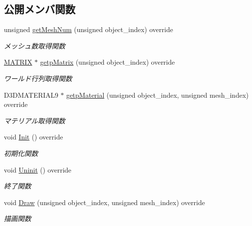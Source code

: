 \subsection*{公開メンバ関数}
\begin{DoxyCompactItemize}
\item 
unsigned \mbox{\hyperlink{class_needle_draw_a904f0aa7550f450f4b7bb2845c863e23}{get\+Mesh\+Num}} (unsigned object\+\_\+index) override
\begin{DoxyCompactList}\small\item\em メッシュ数取得関数 \end{DoxyCompactList}\item 
\mbox{\hyperlink{_matrix_8h_a032295cd9fb1b711757c90667278e744}{M\+A\+T\+R\+IX}} $\ast$ \mbox{\hyperlink{class_needle_draw_a7ae74f52a190793745b5339a6be559d7}{getp\+Matrix}} (unsigned object\+\_\+index) override
\begin{DoxyCompactList}\small\item\em ワールド行列取得関数 \end{DoxyCompactList}\item 
D3\+D\+M\+A\+T\+E\+R\+I\+A\+L9 $\ast$ \mbox{\hyperlink{class_needle_draw_aff38ea3f7201eb584e81ae9d6b9328cf}{getp\+Material}} (unsigned object\+\_\+index, unsigned mesh\+\_\+index) override
\begin{DoxyCompactList}\small\item\em マテリアル取得関数 \end{DoxyCompactList}\item 
void \mbox{\hyperlink{class_needle_draw_a8b170b4ed205bba8ca991a4dc7779844}{Init}} () override
\begin{DoxyCompactList}\small\item\em 初期化関数 \end{DoxyCompactList}\item 
void \mbox{\hyperlink{class_needle_draw_ad831a9aba09ad3932832a23301bd6143}{Uninit}} () override
\begin{DoxyCompactList}\small\item\em 終了関数 \end{DoxyCompactList}\item 
void \mbox{\hyperlink{class_needle_draw_a9fb9ee239ee432f2fc3235acbd24647c}{Draw}} (unsigned object\+\_\+index, unsigned mesh\+\_\+index) override
\begin{DoxyCompactList}\small\item\em 描画関数 \end{DoxyCompactList}\end{DoxyCompactItemize}
